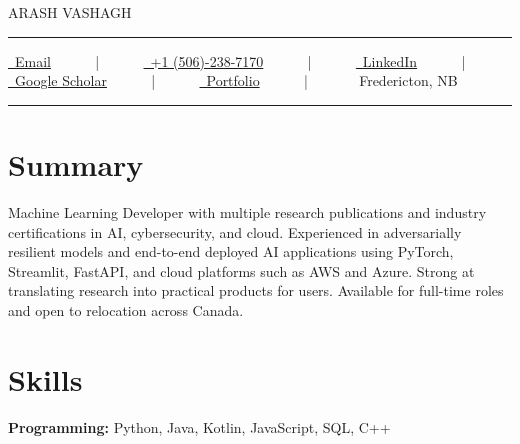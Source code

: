 \documentclass[letterpaper,10pt]{article}
\newcommand{\documentTitle}[2]{
  \begin{center}
    {\Huge\color{accentTitle} #1}
    \vspace{10pt}
    {\color{accentLine} \hrule}
    \vspace{2pt}
    \footnotesize{#2}
    \vspace{2pt}
    {\color{accentLine} \hrule}
  \end{center}
}
\begin{document}
\documentTitle{ARASH VASHAGH}{
  \href{mailto:arash.vashagh@gmail.com}{
    \raisebox{-0.15\height} \faEnvelope\ Email} ~~~~~ | ~~~~~
  \href{tel:+1 (506)-238-7170}{
    \raisebox{-0.05\height} \faPhone\ +1 (506)-238-7170} ~~~~~ | ~~~~~
  \href{https://www.linkedin.com/in/arash-vashagh-23084923a/}{
    \raisebox{-0.15\height} \faLinkedin\ LinkedIn} ~~~~~ | ~~~~~
  \href{https://scholar.google.com/citations?user=yOVk_hcAAAAJ&hl=en}{
    \raisebox{-0.15\height} \faGraduationCap\ Google Scholar} ~~~~~ | ~~~~~
  \href{https://www.arashvashagh.com/}{
    \raisebox{-0.15\height} \faGlobe\ Portfolio} ~~~~~ | ~~~~~
  \raisebox{-0.15\height} \faMapMarker\ Fredericton, NB
}


\section{Summary}




Machine Learning Developer with multiple research publications and industry certifications in AI, cybersecurity, and cloud. Experienced in adversarially resilient models and end-to-end deployed AI applications using PyTorch, Streamlit, FastAPI, and cloud platforms such as AWS and Azure. Strong at translating research into practical products for users. Available for full-time roles and open to relocation across Canada.


\section{Skills}
\textbf{Programming:} Python, Java, Kotlin, JavaScript, SQL, C++ \\
\end{document}
